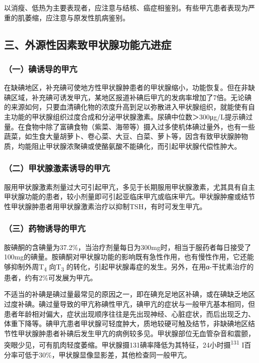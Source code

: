 以消瘦、低热为主要表现者，应注意与结核、癌症相鉴别。有些甲亢患者表现为严重的肌萎缩，应注意与原发性肌病鉴别。

\protect\hypertarget{text00300.html}{}{}

\subsection{三、外源性因素致甲状腺功能亢进症}

\subsubsection{（一）碘诱导的甲亢}

在缺碘地区，补充碘可使地方性甲状腺肿患者的甲状腺缩小，功能恢复。但在非缺碘区域，补充碘可诱发甲亢，某地区报道补碘后甲亢的发病率增加了7倍。无论碘的来源如何，只要血清碘化物的浓度升高到足以弥散进入甲状腺组织，就能使有自主功能的甲状腺组织过度合成和分泌甲状腺激素。尿碘中位数＞300μg/L提示碘过量。在食物中除了富碘食物（紫菜、海带等）摄入过多使机体碘过量外，也有一些蔬菜，如生食大量胡萝卜、卷心菜、大豆、白菜、萝卜等，因含有致甲状腺肿物质，均能阻止甲状腺浓聚碘或使酪氨酸不能碘化，而引起甲状腺代偿性肿大。

\subsubsection{（二）甲状腺激素诱导的甲亢}

服用甲状腺激素剂量过大可引起甲亢，多见于长期服用甲状腺激素，尤其具有自主甲状腺功能的患者，较小剂量即可引起亚临床甲亢或临床甲亢。甲状腺肿瘤或结节性甲状腺肿患者用甲状腺激素治疗以抑制TSH，有时可发生甲亢。

\subsubsection{（三）药物诱导的甲亢}

胺碘酮的含碘量为37.2\%，当治疗剂量每日为300mg时，相当于服药者每日接受了100mg的碘量。胺碘酮对甲状腺功能的影响既有急性作用，也有慢性作用，它还能够抑制外周T\textsubscript{4}
向T\textsubscript{3}
的转化，引起甲状腺毒症的发生。另外，在用α-干扰素治疗的患者，约有2\%可发展为甲亢。

不适当的补碘是碘过量最常见的原因之一，即在碘充足地区补碘，或在碘缺乏地区过度补碘。碘过量导致的甲亢称碘性甲亢，碘甲亢的症状与一般甲亢基本相同，但患者年龄相对偏大，症状出现顺序往往是先出现神经、心脏症状，而后出现乏力、体重下降等。碘甲亢患者甲状腺可轻度肿大，质地较硬可触及结节，非缺碘地区结节性甲状腺肿患者补碘后发生甲亢的病例较多见。甲状腺部位无血管杂音和震颤，突眼少见，可有肌肉轻度萎缩。甲状腺摄131碘率降低为其特征，24小时摄\textsuperscript{131}
I百分率可低于30\%，甲状腺显像显影差，其他检查同一般甲亢。

